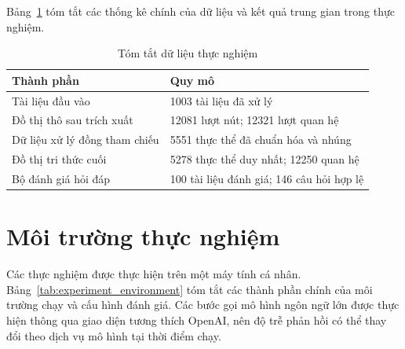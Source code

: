 Bảng~\ref{tab:data_summary} tóm tắt các thống kê chính của dữ liệu và kết quả trung gian trong thực nghiệm.

\begin{table}[h]
\centering
\caption{Tóm tắt dữ liệu thực nghiệm}
\label{tab:data_summary}
\renewcommand{\arraystretch}{1.18}
\begin{tabularx}{\textwidth}{|p{}|X|}
\hline
\textbf{Thành phần} & \textbf{Quy mô} \\
\hline
Tài liệu đầu vào & 1003 tài liệu đã xử lý \\
\hline
Đồ thị thô sau trích xuất & 12081 lượt nút; 12321 lượt quan hệ \\
\hline
Dữ liệu xử lý đồng tham chiếu & 5551 thực thể đã chuẩn hóa và nhúng \\
\hline
Đồ thị tri thức cuối & 5278 thực thể duy nhất; 12250 quan hệ \\
\hline
Bộ đánh giá hỏi đáp & 100 tài liệu đánh giá; 146 câu hỏi hợp lệ \\
\hline
\end{tabularx}
\end{table}

\section{Môi trường thực nghiệm}

Các thực nghiệm được thực hiện trên một máy tính cá nhân. Bảng~\ref{tab:experiment_environment} tóm tắt các thành phần chính của môi trường chạy và cấu hình đánh giá. Các bước gọi mô hình ngôn ngữ lớn được thực hiện thông qua giao diện tương thích OpenAI, nên độ trễ phản hồi có thể thay đổi theo dịch vụ mô hình tại thời điểm chạy.

